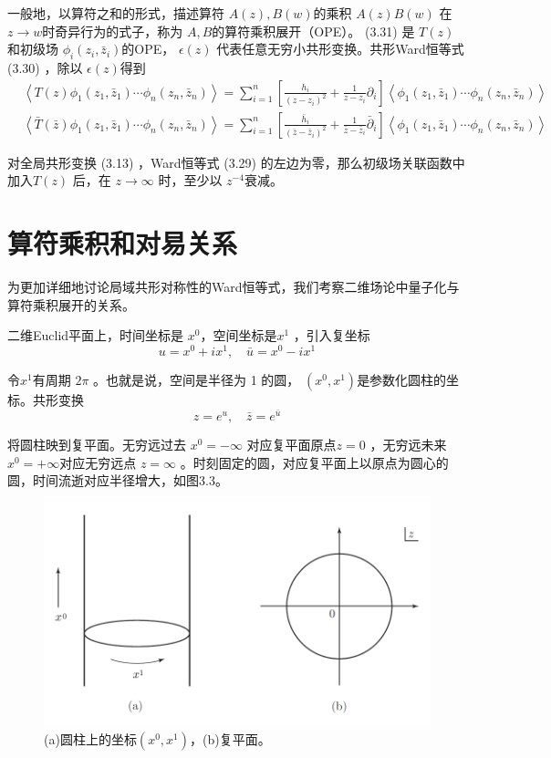 一般地，以算符之和的形式，描述算符 $A(z),B(w) $的乘积 $A(z)B(w)$ 在 $z\to w $时奇异行为的式子，称为 $A,B $的算符乘积展开（OPE）。 (3.31) 是 $T(z) $和初级场 $\phi_i(z_i,\bar{z}_i) $的OPE， $\epsilon(z)$ 代表任意无穷小共形变换。共形Ward恒等式 (3.30) ，除以 $\epsilon(z) $得到
\begin{align} 
	&\left\langle T(z) \phi_{1}\left(z_{1}, \bar{z}_{1}\right) \cdots \phi_{n}\left(z_{n}, \bar{z}_{n}\right)\right\rangle=\sum_{i=1}^{n}\left[\frac{h_{i}}{\left(z-z_{i}\right)^{2}}+\frac{1}{z-z_{i}} \partial_{i}\right]\left\langle\phi_{1}\left(z_{1}, \bar{z}_{1}\right) \cdots \phi_{n}\left(z_{n}, \bar{z}_{n}\right)\right\rangle  \\&\left\langle\bar{T}(\bar{z}) \phi_{1}\left(z_{1}, \bar{z}_{1}\right) \cdots \phi_{n}\left(z_{n}, \bar{z}_{n}\right)\right\rangle=\sum_{i=1}^{n}\left[\frac{\bar{h}_{i}}{\left(\bar{z}-\bar{z}_{i}\right)^{2}}+\frac{1}{\bar{z}-\bar{z}_{i}} \bar{\partial}_{i}\right]\left\langle\phi_{1}\left(z_{1}, \bar{z}_{1}\right) \cdots \phi_{n}\left(z_{n}, \bar{z}_{n}\right)\right\rangle
\end{align}

对全局共形变换 (3.13) ，Ward恒等式 (3.29) 的左边为零，那么初级场关联函数中加入$ T(z)$ 后，在 $z\to \infty$ 时，至少以 $z^{-4} $衰减。

\section{算符乘积和对易关系}

为更加详细地讨论局域共形对称性的Ward恒等式，我们考察二维场论中量子化与算符乘积展开的关系。

二维Euclid平面上，时间坐标是 $x^0 $，空间坐标是$ x^1$ ，引入复坐标
\begin{equation}
u=x^{0}+i x^{1}, \quad \bar{u}=x^{0}-i x^{1}
\end{equation}

令$ x^1 $有周期 $2\pi$ 。也就是说，空间是半径为 1 的圆， $(x^0,x^1) $是参数化圆柱的坐标。共形变换
\begin{equation}
	z=e^{u}, \quad \bar{z}=e^{\bar{u}}
\end{equation}

将圆柱映到复平面。无穷远过去 $x^0=-\infty$ 对应复平面原点$ z=0$ ，无穷远未来 $x^0=+\infty $对应无穷远点 $z=\infty$ 。时刻固定的圆，对应复平面上以原点为圆心的圆，时间流逝对应半径增大，如图3.3。
\begin{figure}[h]
	\centering
	\includegraphics[width=0.6\linewidth]{fig/3.3.png}
	\caption{(a)圆柱上的坐标$(x^0,x^1)$，(b)复平面。}
\end{figure}


